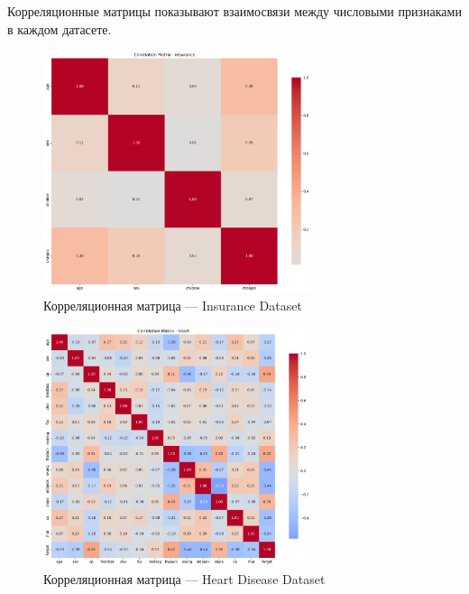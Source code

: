 \documentclass[a4paper]{article}
\begin{document}
Корреляционные матрицы показывают взаимосвязи между числовыми признаками в каждом датасете.

\begin{figure}[H]
\centering
\includegraphics[width=0.7\textwidth]{images/correlation_heatmap_insurance.png}
\caption{Корреляционная матрица — Insurance Dataset}
\end{figure}

\begin{figure}[H]
\centering
\includegraphics[width=0.7\textwidth]{images/correlation_heatmap_heart.png}
\caption{Корреляционная матрица — Heart Disease Dataset}
\end{figure}
\end{document}
